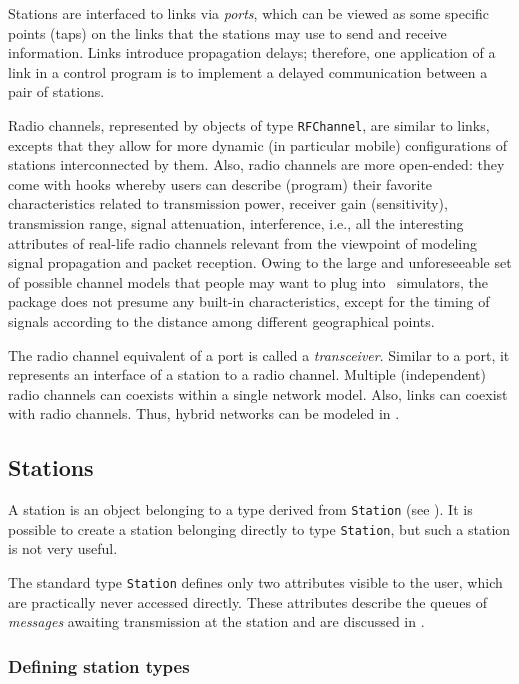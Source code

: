 Stations are interfaced to links via {\em ports},
which can be viewed as some specific points (taps) on the links
that the stations may use to send and receive information.
Links introduce propagation delays; therefore, one application of a link
in a control program is to implement a delayed communication between a pair
of stations.

Radio channels, represented by objects of type {\tt RFChannel}, are similar
to links, excepts that they allow for more dynamic (in particular mobile)
configurations of stations interconnected by them.
Also, radio channels are more open-ended: they come with hooks whereby users
can describe (program)
their favorite characteristics related to
transmission power, receiver gain (sensitivity), transmission
range, signal attenuation, interference, i.e., all the interesting attributes
of real-life radio channels relevant from the viewpoint of modeling signal
propagation and packet reception.
Owing to the large and unforeseeable set of possible channel models that
people may want to plug into \smurph\ simulators, the package does not
presume any built-in characteristics, except for the timing of signals
according to the distance among different geographical points.

The radio channel equivalent of a port is called a {\em transceiver}.
Similar to a port, it represents an interface of a station to a
radio channel.
Multiple (independent) radio channels can coexists within a single network
model.
Also, links can coexist with radio channels.
Thus, hybrid networks can be modeled in \smurph.

\subsection{Stations}
\label{rm_to_st}

A station is an object belonging to a type derived from {\tt Station}
(see ).
It is possible to create a station belonging directly to type
{\tt Station}, but such a station is not very useful.

The standard type {\tt Station} defines only two attributes visible to the
user, which are practically never accessed directly.
These attributes describe the queues of {\em messages\/} awaiting transmission
at the station and are discussed in .

\subsubsection{Defining station types}
\label{rm_to_st_ds}

